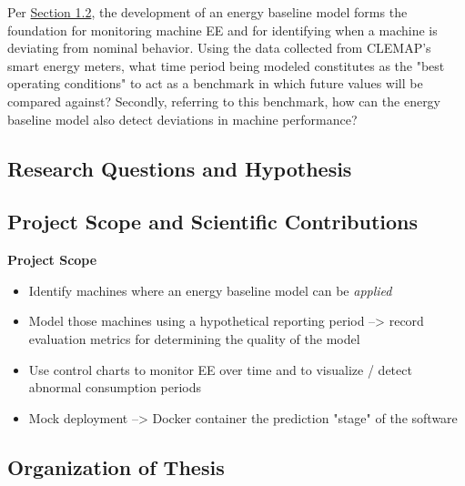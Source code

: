 Per \hyperlink{subsection.1.2}{Section 1.2}, the development of an energy baseline model forms the foundation for monitoring machine EE and for identifying when a machine is deviating from nominal behavior. Using the data collected from CLEMAP's smart energy meters, what time period being modeled constitutes as the "best operating conditions" to act as a benchmark in which future values will be compared against? Secondly, referring to this benchmark, how can the energy baseline model also detect deviations in machine performance?

\subsection{Research Questions and Hypothesis}

\subsection{Project Scope and Scientific Contributions}

\textbf{Project Scope}
\begin{itemize}
    \item Identify machines where an energy baseline model can be \textit{applied}
    \item Model those machines using a hypothetical reporting period --> record evaluation metrics for determining the quality of the model
    \item Use control charts to monitor EE over time and to visualize / detect abnormal consumption periods
    \item Mock deployment --> Docker container the prediction "stage" of the software
\end{itemize}

\subsection{Organization of Thesis}